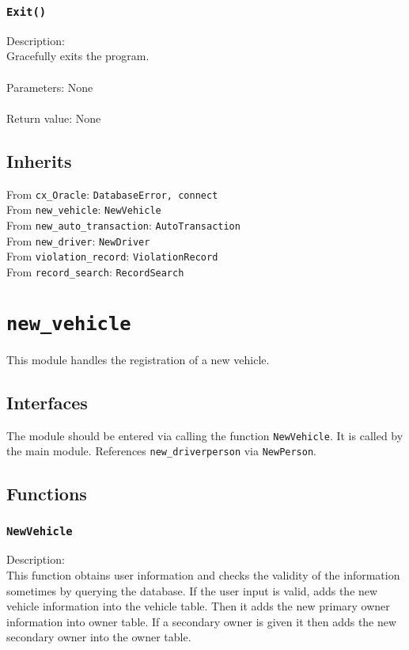 \documentclass[12pt]{article}
\begin{document}
\subsubsection{\texttt{Exit()}}
Description: \\
\indent Gracefully exits the program.\\\\
Parameters: None\\\\
Return value: None


\subsection{Inherits}
From \texttt{cx\_Oracle}: \texttt{DatabaseError, connect}\\
From \texttt{new\_vehicle}: \texttt{NewVehicle}\\
From \texttt{new\_auto\_transaction}: \texttt{AutoTransaction}\\
From \texttt{new\_driver}: \texttt{NewDriver}\\
From \texttt{violation\_record}: \texttt{ViolationRecord}\\
From \texttt{record\_search}: \texttt{RecordSearch}

\newpage
\section{\texttt{new\_vehicle}}
This module handles the registration of a new vehicle.
\subsection{Interfaces}
The module should be entered via calling the function \texttt{NewVehicle}. It is called by the main module.
References \texttt{new\_driverperson} via \texttt{NewPerson}.
\subsection{Functions}
\subsubsection{\texttt{NewVehicle}}
Description:\\
\indent This function obtains user information and checks the
validity of the information sometimes by querying the
database. If the user input is valid, adds the new vehicle
information into the vehicle table.
Then it adds the new primary owner information into owner table.
If a secondary owner is given it then adds the new secondary
owner into the owner table.
\end{document}
